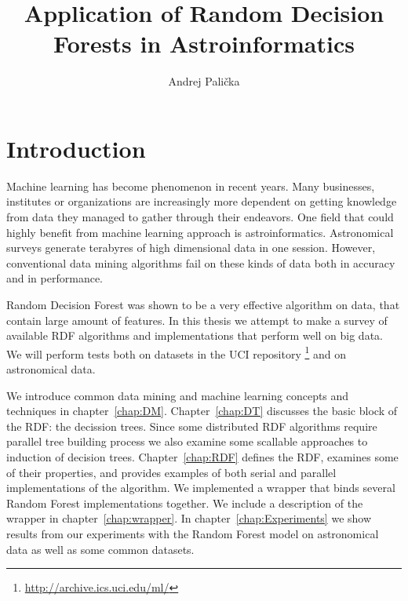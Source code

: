 \documentclass[thesis=B,english]{FITthesis}[2012/10/20]
\title{Application of Random Decision Forests in Astroinformatics}
\author{Andrej Pali{\v c}ka} %
\begin{document}

\chapter{Introduction}
Machine learning has become phenomenon in recent years. Many businesses, institutes or organizations are increasingly more dependent on getting knowledge from data they managed to gather through their endeavors. One field that could highly benefit from machine learning approach is astroinformatics.  Astronomical surveys generate terabyres of high dimensional data in one session. However, conventional data mining algorithms fail on these kinds of data both in accuracy and in performance. 

Random Decision Forest \cite{BR01} was shown to be a very effective algorithm on data, that contain large amount of features. In this thesis we attempt to make a survey of available RDF algorithms and implementations that perform well on big data. We will perform tests both on datasets in the UCI repository \footnote{\url{http://archive.ics.uci.edu/ml/}} and on astronomical data.

We introduce common data mining and machine learning concepts and techniques in chapter~\ref{chap:DM}. Chapter~\ref{chap:DT} discusses the basic block of the RDF: the decission trees. Since some distributed RDF algorithms require parallel tree building process we also examine some scallable approaches to induction of decision trees. Chapter~\ref{chap:RDF} defines the RDF, examines some of their properties, and provides examples of both serial and parallel implementations of the algorithm. We implemented a wrapper that binds several Random Forest implementations together. We include a description of the wrapper in chapter~\ref{chap:wrapper}. In chapter~\ref{chap:Experiments} we show results from our experiments with the Random Forest model on astronomical data as well as some common datasets.
\end{document}
